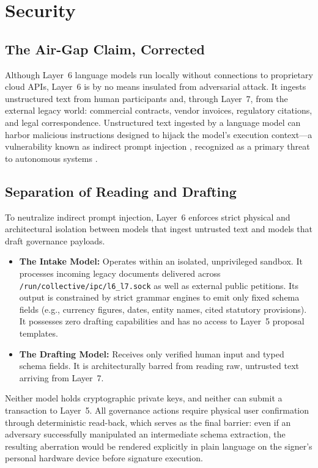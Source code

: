 \section{Security}

\subsection{The Air-Gap Claim, Corrected}

Although Layer~6 language models run locally without connections to proprietary cloud APIs, Layer~6 is by no means insulated from adversarial attack. It ingests unstructured text from human participants and, through Layer~7, from the external legacy world: commercial contracts, vendor invoices, regulatory citations, and legal correspondence. Unstructured text ingested by a language model can harbor malicious instructions designed to hijack the model's execution context---a vulnerability known as indirect prompt injection \parencite{greshake2023injection}, recognized as a primary threat to autonomous systems \parencite{owasp2023llm}.

\subsection{Separation of Reading and Drafting}

To neutralize indirect prompt injection, Layer~6 enforces strict physical and architectural isolation between models that ingest untrusted text and models that draft governance payloads.
\begin{itemize}
  \item \textbf{The Intake Model:} Operates within an isolated, unprivileged sandbox. It processes incoming legacy documents delivered across \texttt{/run/collective/ipc/l6\_l7.sock} as well as external public petitions. Its output is constrained by strict grammar engines to emit only fixed schema fields (e.g., currency figures, dates, entity names, cited statutory provisions). It possesses zero drafting capabilities and has no access to Layer~5 proposal templates.
  \item \textbf{The Drafting Model:} Receives only verified human input and typed schema fields. It is architecturally barred from reading raw, untrusted text arriving from Layer~7.
\end{itemize}
Neither model holds cryptographic private keys, and neither can submit a transaction to Layer~5. All governance actions require physical user confirmation through deterministic read-back, which serves as the final barrier: even if an adversary successfully manipulated an intermediate schema extraction, the resulting aberration would be rendered explicitly in plain language on the signer's personal hardware device before signature execution.


